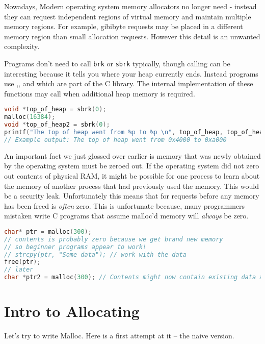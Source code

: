 Nowadays, Modern operating system memory allocators no longer need  - instead they can request independent regions of virtual memory and maintain multiple memory regions.
For example, gibibyte requests may be placed in a different memory region than small allocation requests.
However this detail is an unwanted complexity.

Programs don't need to call \texttt{brk} or \texttt{sbrk} typically, though calling  can be interesting because it tells you where your heap currently ends.
Instead programs use ,, and  which are part of the C library.
The internal implementation of these functions may call  when additional heap memory is required.

\begin{lstlisting}[language=C]
void *top_of_heap = sbrk(0);
malloc(16384);
void *top_of_heap2 = sbrk(0);
printf("The top of heap went from %p to %p \n", top_of_heap, top_of_heap2);
// Example output: The top of heap went from 0x4000 to 0xa000
\end{lstlisting}

An important fact we just glossed over earlier is memory that was newly obtained by the operating system must be zeroed out.
If the operating system did not zero out contents of physical RAM, it might be possible for one process to learn about the memory of another process that had previously used the memory.
This would be a security leak.
Unfortunately this means that for  requests before any memory has been freed is \emph{often} zero.
This is unfortunate because, many programmers mistaken write C programs that assume malloc'd memory will \emph{always} be zero.

\begin{lstlisting}[language=C]
char* ptr = malloc(300);
// contents is probably zero because we get brand new memory
// so beginner programs appear to work!
// strcpy(ptr, "Some data"); // work with the data
free(ptr);
// later
char *ptr2 = malloc(300); // Contents might now contain existing data and is probably not zero
\end{lstlisting}

\section{Intro to Allocating}

Let's try to write Malloc.
Here is a first attempt at it -- the naive version.

